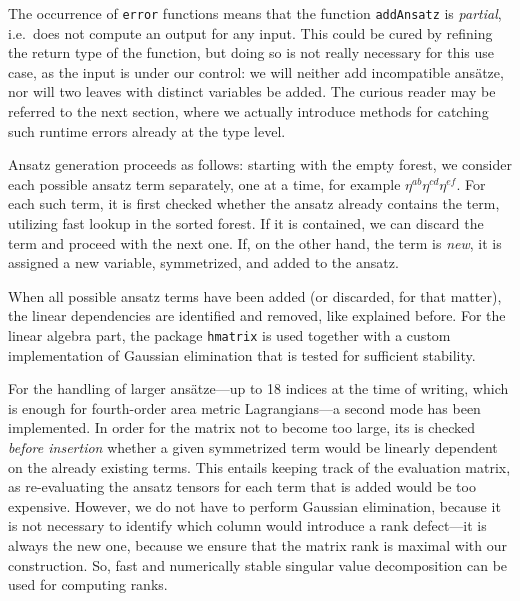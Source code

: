 The occurrence of \texttt{error} functions means that the function \texttt{addAnsatz} is \emph{partial}, i.e.\ does not compute an output for any input. This could be cured by refining the return type of the function, but doing so is not really necessary for this use case, as the input is under our control: we will neither add incompatible ansätze, nor will two leaves with distinct variables be added. The curious reader may be referred to the next section, where we actually introduce methods for catching such runtime errors already at the type level.

Ansatz generation proceeds as follows: starting with the empty forest, we consider each possible ansatz term separately, one at a time, for example $\eta^{ab} \eta^{cd} \eta^{ef}$. For each such term, it is first checked whether the ansatz already contains the term, utilizing fast lookup in the sorted forest. If it is contained, we can discard the term and proceed with the next one. If, on the other hand, the term is \emph{new}, it is assigned a new variable, symmetrized, and added to the ansatz.

When all possible ansatz terms have been added (or discarded, for that matter), the linear dependencies are identified and removed, like explained before. For the linear algebra part, the package \texttt{hmatrix} \cite{Ruiz_2006} is used together with a custom implementation of Gaussian elimination that is tested for sufficient stability.

For the handling of larger ansätze---up to 18 indices at the time of writing, which is enough for fourth-order area metric Lagrangians---a second mode has been implemented. In order for the matrix not to become too large, its is checked \emph{before insertion} whether a given symmetrized term would be linearly dependent on the already existing terms. This entails keeping track of the evaluation matrix, as re-evaluating the ansatz tensors for each term that is added would be too expensive. However, we do not have to perform Gaussian elimination, because it is not necessary to identify which column would introduce a rank defect---it is always the new one, because we ensure that the matrix rank is maximal with our construction. So, fast and numerically stable singular value decomposition can be used for computing ranks.

